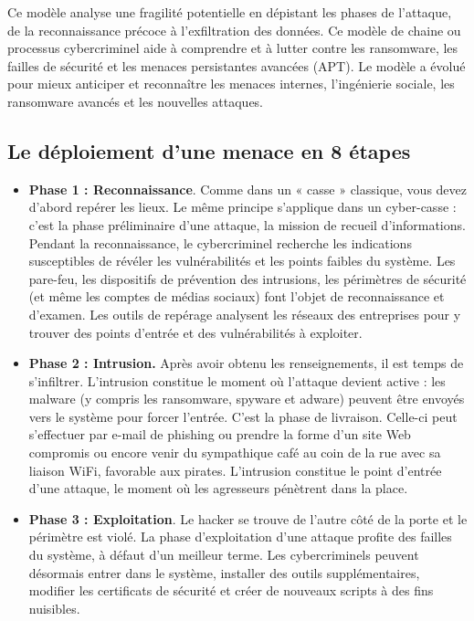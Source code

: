 Ce modèle analyse une fragilité potentielle en dépistant les phases de l’attaque, de la reconnaissance précoce à l’exfiltration des données. Ce modèle de chaine ou processus cybercriminel aide à comprendre et à lutter contre les ransomware, les failles de sécurité et les menaces persistantes avancées (APT). Le modèle a évolué pour mieux anticiper et reconnaître les menaces internes, l’ingénierie sociale, les ransomware avancés et les nouvelles attaques.

\subsection{Le déploiement d'une menace en 8 étapes}


\begin{itemize}
  \item \textbf{Phase 1 : Reconnaissance}. Comme dans un « casse » classique, vous devez d’abord repérer les lieux. Le même principe s’applique dans un cyber-casse : c’est la phase préliminaire d’une attaque, la mission de recueil d’informations. Pendant la reconnaissance, le cybercriminel recherche les indications susceptibles de révéler les vulnérabilités et les points faibles du système. Les pare-feu, les dispositifs de prévention des intrusions, les périmètres de sécurité (et même les comptes de médias sociaux) font l’objet de reconnaissance et d’examen. Les outils de repérage analysent les réseaux des entreprises pour y trouver des points d’entrée et des vulnérabilités à exploiter.

 \item \textbf{Phase 2 : Intrusion.} Après avoir obtenu les renseignements, il est temps de s’infiltrer. L’intrusion constitue le moment où l’attaque devient active : les malware (y compris les ransomware, spyware et adware) peuvent être envoyés vers le système pour forcer l’entrée. C’est la phase de livraison. Celle-ci peut s’effectuer par e-mail de phishing ou prendre la forme d’un site Web compromis ou encore venir du sympathique café au coin de la rue avec sa liaison WiFi, favorable aux pirates. L’intrusion constitue le point d’entrée d’une attaque, le moment où les agresseurs pénètrent dans la place.

 \item \textbf{Phase 3 : Exploitation}. Le hacker se trouve de l’autre côté de la porte et le périmètre est violé. La phase d’exploitation d’une attaque profite des failles du système, à défaut d’un meilleur terme. Les cybercriminels peuvent désormais entrer dans le système, installer des outils supplémentaires, modifier les certificats de sécurité et créer de nouveaux scripts à des fins nuisibles.


\end{itemize}
